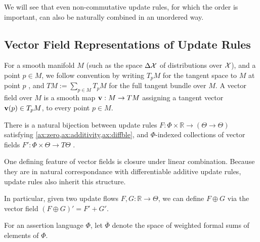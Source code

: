 \documentclass{article}
\newcommand{\ext}[1]{\overline #1} %
\begin{document}
We will see that even non-commutative update rules, for which the order is important, can also be naturally combined in an unordered way.

\subsection{Vector Field Representations of Update Rules}
    \label{sec:vecrep}
For a smooth manifold $M$
(such as the space $\Delta \mathcal X$ of distributions over $\mathcal X$),
and a point $p \in M$, we follow convention by writing $T_p M$ for the tangent space to $M$ at point $p$ \parencite{lee2013smooth}, and %
$TM := \sum_{p \in M} T_p M$ for the full tangent bundle over $M$.
%
A vector field over $M$ is a smooth map $\mathbf{v} : M \to T M$ assigning a tangent vector $\mathbf{v}(p) \in T_p M$, to every point $p \in M$.

\begin{theorem}\label{thm:vecrep}
    There is a natural bijection between
    update rules $F : \Phi \times \mathbb R \to (\Theta  \to \Theta)$
        satisfying \cref{ax:zero,ax:additivity,ax:diffble},
    and $\Phi$-indexed collections of vector fields
        $ F' :  \Phi \times \Theta \to T \Theta$%
    .
\end{theorem}

One defining feature of vector fields is closure under linear
    combination.
Because they are in natural correspondance with differentiable additive update rules, update rules also inherit this structure.

In particular, given two update flows $F, G : \mathbb R \to \Theta$, we can define
$F \oplus G$ via the vector field $(F \oplus G)' = F' + G'$.


\begin{defn}
    For an assertion language $\Phi$, let $\ext\Phi$ denote
    the space of weighted formal sums of elements of $\Phi$.
\end{defn}
\end{document}
